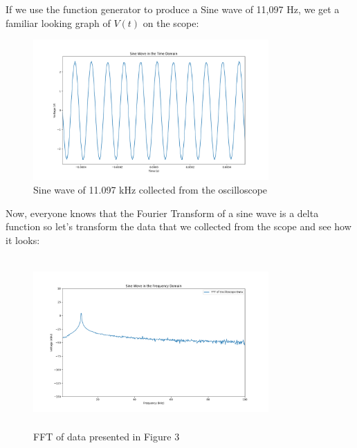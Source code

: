 \documentclass{article}
\begin{document}
If we use the function generator to produce a Sine wave of 11,097 Hz, we get a
familiar looking graph of $V(t)$ on the scope:

\begin{figure}[H]
    \centering
\begin{minipage}{10cm}
\begin{tcolorbox}
        \includegraphics[width=9cm, height=5.cm]{figures/figure3.png}
        \caption{Sine wave of 11.097 kHz collected from the oscilloscope}
        \label{fig:fig3}
\end{tcolorbox}
\end{minipage}
\end{figure}

Now, everyone knows that the Fourier Transform of a sine wave is a delta
function so let's transform the data that we collected from the scope and see
how it looks:

\begin{figure}[H]
    \centering
\begin{minipage}{10cm}
\begin{tcolorbox}
        \includegraphics[width=9cm, height=6.5cm]{figures/figure4.png}
        \caption{FFT of data presented in Figure 3}
        \label{fig:fig4}
\end{tcolorbox}
\end{minipage}
\end{figure}
\end{document}
